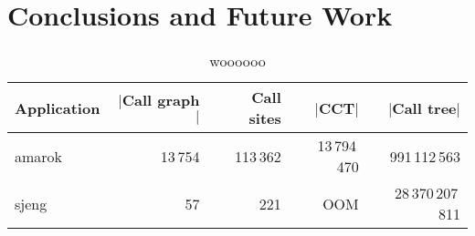 \chapter{Conclusions and Future Work}
\label{ch:conclusions}

\begin{table}[ht]
\begin{center}
\begin{tabular}{|l|r r r r|}
\hline
Application & $|$Call graph$|$ & Call sites & $|$CCT$|$ & $|$Call tree$|$\\
\hline
amarok & 13\,754 & 113\,362 & 13\,794\,470 & 991\,112\,563 \\
sjeng & 57 & 221 & OOM & 28\,370\,207\,811 \\
\hline
\end{tabular}
\caption{woooooo}
\end{center}
\end{table}